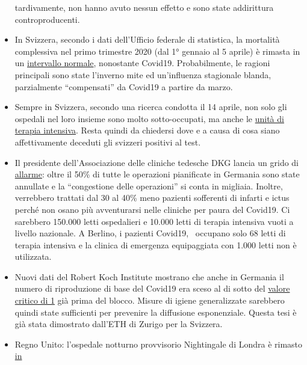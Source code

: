 \begin{itemize}
  tardivamente, non hanno avuto nessun effetto e sono state addirittura
  controproducenti.
\item
  In Svizzera, secondo i dati dell'Ufficio federale di statistica, la
  mortalità complessiva nel primo trimestre 2020 (dal 1° gennaio al 5
  aprile) è rimasta in un
  \href{https://swprs.files.wordpress.com/2020/04/ch-mortalitaet-q1-2020.pdf}{intervallo
  normale}, nonostante Covid19. Probabilmente, le ragioni principali
  sono state l'inverno mite ed un'influenza stagionale blanda,
  parzialmente ``compensati'' da Covid19 a partire da marzo.
\item
  Sempre in Svizzera, secondo una ricerca condotta il 14 aprile, non
  solo gli ospedali nel loro insieme sono molto sotto-occupati, ma anche
  le
  \href{https://swprs.files.wordpress.com/2020/04/intensivbettenbelegung-schweiz-2020-04-14.png}{unità
  di terapia intensiva}. Resta quindi da chiedersi dove e a causa di
  cosa siano affettivamente deceduti gli svizzeri positivi al test.
\item
  Il presidente dell'Associazione delle cliniche tedesche DKG lancia un
  grido di
  \href{https://www.bz-berlin.de/deutschland/kliniken-verband-schlaegt-alarm-wegen-corona-regeln}{allarme}:
  oltre il 50\% di tutte le operazioni pianificate in Germania sono
  state annullate e la ``congestione delle operazioni'' si conta in
  migliaia. Inoltre, verrebbero trattati dal 30 al 40\% meno pazienti
  sofferenti di infarti e ictus perché non osano più avventurarsi nelle
  cliniche per paura del Covid19. Ci sarebbero 150.000 letti ospedalieri
  e 10.000 letti di terapia intensiva vuoti a livello nazionale. A
  Berlino, i pazienti Covid19, ~occupano solo 68 letti di terapia
  intensiva e la clinica di emergenza equipaggiata con 1.000 letti non è
  utilizzata.
\item
  Nuovi dati del Robert Koch Institute mostrano che anche in Germania il
  numero di riproduzione di base del Covid19 era sceso al di sotto del
  \href{https://www.rki.de/DE/Content/Infekt/EpidBull/Archiv/2020/Ausgaben/17_20_SARS-CoV2_vorab.pdf?__blob=publicationFile\#page=5}{valore
  critico di 1} già prima del blocco. Misure di igiene generalizzate
  sarebbero quindi state sufficienti per prevenire la diffusione
  esponenziale. Questa tesi è già stata dimostrato dall'ETH di Zurigo
  per la Svizzera.
\item
  Regno Unito: l'ospedale notturno provvisorio Nightingale di Londra è
  rimasto
  \href{https://www.hsj.co.uk/service-design/exclusive-nightingale-largely-empty-as-icus-handle-surge/7027398.article}{in
}
\end{itemize}
